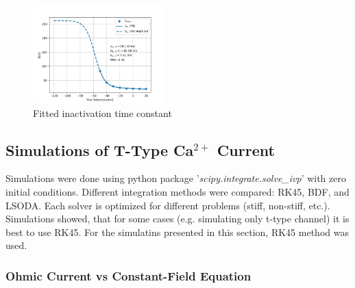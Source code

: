 \documentclass[../../workflow.tex]{subfiles}
\begin{document}
\begin{figure}[H]
    \centering
    \includegraphics[width=0.45\textwidth]{./img/t_type_calcium_channel/inactivation_tau_fit_2.png}
    \caption{Fitted inactivation time constant}
    \label{fig:data_fitted_taus_from_jeong_inactivation}
\end{figure}

\FloatBarrier


\subsection{Simulations of T-Type \texorpdfstring{Ca$^{2+}$}{Ca+2} Current}\label{subsec_r5_simulations_t_type_current}

Simulations were done using python package '\textit{scipy.integrate.solve\_ivp}' with
zero initial conditions. Different integration methods were compared: RK45, BDF, and LSODA.
Each solver is optimized for different problems (stiff, non-stiff, etc.). Simulations
showed, that for some cases (e.g. simulating only t-type channel) it is best to use
RK45. For the simulatins presented in this section, RK45 method was used.

\subsubsection{Ohmic Current vs Constant-Field Equation}

\color{orange}
\end{document}
